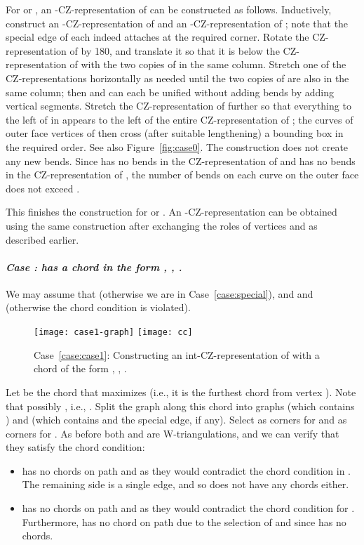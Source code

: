 \documentclass{article}
\renewcommand{\int}[1]{}
\newcounter{thecase} \setcounter{thecase}{0}
\newcommand{\case}[1]{\noindent
            \refstepcounter{thecase}\paragraph*{\textnormal{\textit{Case \arabic{thecase}: #1}}}
}
\begin{document}
For  or ,
an \int{F}-CZ-representation of  
can be constructed as follows. Inductively, construct an 
\int{F}-CZ-representation of  and an 
\int{(C,a_i)}-CZ-representation of ; note that the special edge
of each indeed attaches at the required corner. Rotate
the CZ-representation of  by 180, and translate it
so that it is below the CZ-representation of  with the two
copies of  in the same column.  Stretch one of the CZ-representations 
horizontally as needed until the two copies of  are also in
the same column; then  and  can each be unified without
adding bends by adding vertical segments.    Stretch the CZ-representation
of  further so that everything to the left of  in 
appears to the left of the entire CZ-representation of ; the curves
of outer face vertices of  then cross (after suitable lengthening)
a bounding box in the required order.  
See also Figure~\ref{fig:case0}.
The construction does not create any new bends. Since  has no bends in the CZ-representation of  and  has
no bends in the CZ-representation of , the number of bends on each curve on the outer face does not exceed .

This finishes the construction for  or .  
An \int{(C,b_{s-1})}-CZ-representation can be obtained using the
same construction after exchanging the roles of vertices  and 
as described earlier.

\case{ has a chord in the form , , .}
\label{case:case1}
We may assume that  (otherwise we are in Case~\ref{case:special}), 
and  and  (otherwise the chord condition is violated).


\begin{figure}
\centering
\texttt{[image: case1-graph]}\hspace{5em}
\texttt{[image: cc]}
\caption{Case~\ref{case:case1}: Constructing an int-CZ-representation of  with a chord of 
the form , , .}
\label{fig:case1-detail}
\end{figure}

Let  be the chord that maximizes  (i.e., it is the furthest chord from vertex ). 
Note that possibly , i.e., . 
Split the graph  along this chord into graphs   (which contains )
and  (which contains  and the special edge, if any).
Select  as corners for  and  as corners for .
As before both  and  are W-triangulations, and we can verify
that they satisfy the chord condition:
\begin{itemize}
\item  has no chords on path  and  as they would contradict the chord condition
in . The remaining side  is a single edge, and so does not have any chords either.
\item  has no chords on path  and  as they would contradict
the chord condition for . Furthermore,  has no chord on path  due to the selection
of  and since  has no chords.
\end{itemize}
\end{document}
